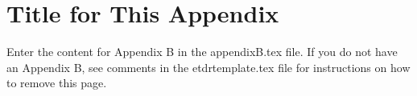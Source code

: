 
\cleardoublepage

\chapter{Title for This Appendix}
\label{Appendix:Key2}

Enter the content for Appendix B in the appendixB.tex file. If you
do not have an Appendix B, see comments in the etdrtemplate.tex file
for instructions on how to remove this page.
